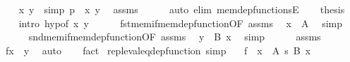 \begin{isabellebody}
\ \ \isamarkupfalse%
\ x\ y\ \ {\isacharbrackleft}{\kern0pt}simp{\isacharbrackright}{\kern0pt}{\isacharcolon}{\kern0pt}\ {\isachardoublequoteopen}p\ {\isacharequal}{\kern0pt}\ {\isasymlangle}x{\isacharcomma}{\kern0pt}\ y{\isasymrangle}{\isachardoublequoteclose}\ \isamarkupfalse%
\ assms\isanewline
\ \ \ \ \isamarkupfalse%
\ {\isacharparenleft}{\kern0pt}auto\ elim{\isacharbang}{\kern0pt}{\isacharcolon}{\kern0pt}\ mem{\isacharunderscore}{\kern0pt}dep{\isacharunderscore}{\kern0pt}functionsE{\isacharparenright}{\kern0pt}\isanewline
\ \ \isamarkupfalse%
\ thesis\isanewline
\ \ \isamarkupfalse%
\ {\isacharparenleft}{\kern0pt}intro\ hyp{\isacharbrackleft}{\kern0pt}of\ x\ y{\isacharbrackright}{\kern0pt}{\isacharparenright}{\kern0pt}\isanewline
\ \ \ \ \isamarkupfalse%
\ fst{\isacharunderscore}{\kern0pt}mem{\isacharunderscore}{\kern0pt}if{\isacharunderscore}{\kern0pt}mem{\isacharunderscore}{\kern0pt}dep{\isacharunderscore}{\kern0pt}function{\isacharbrackleft}{\kern0pt}OF\ assms{\isacharbrackright}{\kern0pt}\ \isamarkupfalse%
\ {\isachardoublequoteopen}x\ {\isasymin}\ A{\isachardoublequoteclose}\ \isamarkupfalse%
\ simp\isanewline
\ \ \ \ \isamarkupfalse%
\ snd{\isacharunderscore}{\kern0pt}mem{\isacharunderscore}{\kern0pt}if{\isacharunderscore}{\kern0pt}mem{\isacharunderscore}{\kern0pt}dep{\isacharunderscore}{\kern0pt}function{\isacharbrackleft}{\kern0pt}OF\ assms{\isacharbrackright}{\kern0pt}\ \isamarkupfalse%
\ {\isachardoublequoteopen}y\ {\isasymin}\ B\ x{\isachardoublequoteclose}\ \isamarkupfalse%
\ simp\isanewline
\ \ \ \ \isamarkupfalse%
\ assms\ \isamarkupfalse%
\ {\isachardoublequoteopen}f{\isacharbackquote}{\kern0pt}x\ {\isacharequal}{\kern0pt}\ y{\isachardoublequoteclose}\ \isamarkupfalse%
\ auto\isanewline
\ \ \isamarkupfalse%
\ fact\isanewline
{}\isamarkupfalse%
%
\endisatagproof
{\isafoldproof}%
%
\isadelimproof
\isanewline
%
\endisadelimproof
\isanewline
{}\isamarkupfalse%
\ repl{\isacharunderscore}{\kern0pt}eval{\isacharunderscore}{\kern0pt}eq{\isacharunderscore}{\kern0pt}dep{\isacharunderscore}{\kern0pt}function\ {\isacharbrackleft}{\kern0pt}simp{\isacharbrackright}{\kern0pt}{\isacharcolon}{\kern0pt}\isanewline
\ \ \ {\isachardoublequoteopen}f\ {\isasymin}\ {\isacharparenleft}{\kern0pt}x\ {\isasymin}\ A{\isacharparenright}{\kern0pt}\ {\isasymrightarrow}s\ {\isacharparenleft}{\kern0pt}B\ x{\isacharparenright}{\kern0pt}{\isachardoublequoteclose}\isanewline

\end{isabellebody}
